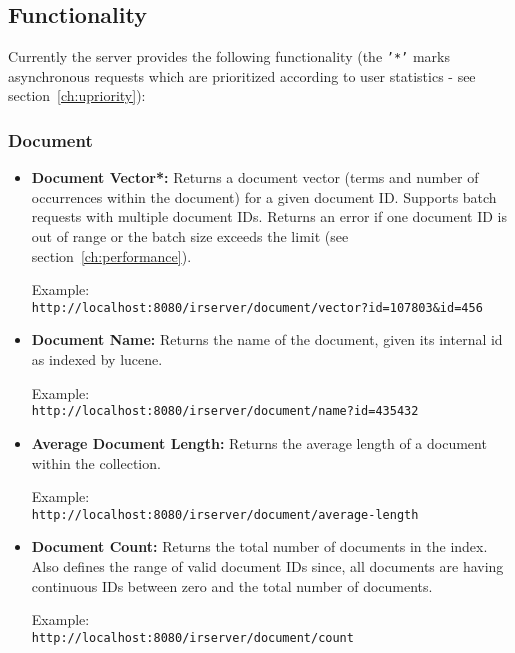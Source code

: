 \documentclass[a4paper,11pt]{article}
\begin{document}
\subsection{Functionality}
Currently the server provides the following functionality (the \texttt{'*'} marks asynchronous requests which are prioritized according to user statistics - see section~\ref{ch:upriority}):

\subsubsection{Document}
\begin{itemize}

\item \textbf{Document Vector*:} Returns a document vector (terms and number of occurrences within the document) for a given document ID. Supports batch requests with multiple document IDs. Returns an error if one document ID is out of range or the batch size exceeds the limit (see section~\ref{ch:performance}).
\begin{leftbar}
Example:\\
\texttt{http://localhost:8080/irserver/document/vector?id=107803\&id=456}
\end{leftbar}

\item \textbf{Document Name:} Returns the name of the document, given its internal id as indexed by lucene.
\begin{leftbar}
Example:\\
\texttt{http://localhost:8080/irserver/document/name?id=435432}
\end{leftbar}

\item \textbf{Average Document Length:} Returns the average length of a document within the collection.
\begin{leftbar}
Example:\\
\texttt{http://localhost:8080/irserver/document/average-length}
\end{leftbar}

\item \textbf{Document Count:} Returns the total number of documents in the index. Also defines the range of valid document IDs since, all documents are having continuous IDs between zero and the total number of documents.
\begin{leftbar}
Example:\\
\texttt{http://localhost:8080/irserver/document/count}
\end{leftbar}
\end{itemize}
\end{document}
